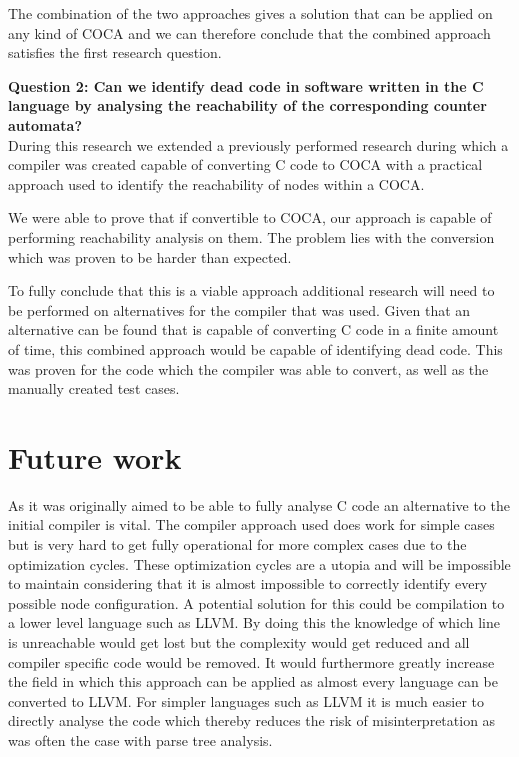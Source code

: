 \documentclass[12pt]{thesis}
\begin{document}
The combination of the two approaches gives a solution that can be applied on any kind of COCA and we can therefore conclude that the combined approach satisfies the first research question.

\noindent
\textbf{Question 2: Can we identify dead code in software written in the C language by analysing the reachability of the corresponding counter automata? } \\
During this research we extended a previously performed research during which a compiler was created capable of converting C code to COCA with a practical approach used to identify the reachability of nodes within a COCA.

We were able to prove that if convertible to COCA, our approach is capable of performing reachability analysis on them. The problem lies with the conversion which was proven to be harder than expected. 

To fully conclude that this is a viable approach additional research will need to be performed on alternatives for the compiler that was used. Given that an alternative can be found that is capable of converting C code in a finite amount of time, this combined approach would be capable of identifying dead code. This was proven for the code which the compiler was able to convert, as well as the manually created test cases.

\chapter{Future work}
As it was originally aimed to be able to fully analyse C code an alternative to the initial compiler is vital. The compiler approach used does work for simple cases but is very hard to get fully operational for more complex cases due to the optimization cycles. These optimization cycles are a utopia and will be impossible to maintain considering that it is almost impossible to correctly identify every possible node configuration. A potential solution for this could be compilation to a lower level language such as LLVM. By doing this the knowledge of which line is unreachable would get lost but the complexity would get reduced and all compiler specific code would be removed. It would furthermore greatly increase the field in which this approach can be applied as almost every language can be converted to LLVM. For simpler languages such as LLVM it is much easier to directly analyse the code which thereby reduces the risk of misinterpretation as was often the case with parse tree analysis.
\end{document}
